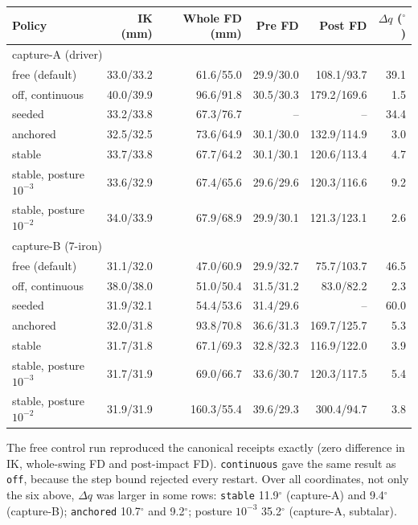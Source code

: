 \documentclass[11pt,a4paper]{article}
\begin{document}
\begin{center}
\small
\begin{tabular}{lrrrrr}
\hline
Policy & IK (mm) & Whole FD (mm) & Pre FD & Post FD & $\Delta q$ ($^\circ$) \\
\hline
\multicolumn{6}{l}{capture-A (driver)} \\
free (default) & 33.0/33.2 & 61.6/55.0 & 29.9/30.0 & 108.1/93.7 & 39.1 \\
off, continuous & 40.0/39.9 & 96.6/91.8 & 30.5/30.3 & 179.2/169.6 & 1.5 \\
seeded & 33.2/33.8 & 67.3/76.7 & -- & -- & 34.4 \\
anchored & 32.5/32.5 & 73.6/64.9 & 30.1/30.0 & 132.9/114.9 & 3.0 \\
stable & 33.7/33.8 & 67.7/64.2 & 30.1/30.1 & 120.6/113.4 & 4.7 \\
stable, posture $10^{-3}$ & 33.6/32.9 & 67.4/65.6 & 29.6/29.6 & 120.3/116.6 & 9.2 \\
stable, posture $10^{-2}$ & 34.0/33.9 & 67.9/68.9 & 29.9/30.1 & 121.3/123.1 & 2.6 \\
\multicolumn{6}{l}{capture-B (7-iron)} \\
free (default) & 31.1/32.0 & 47.0/60.9 & 29.9/32.7 & 75.7/103.7 & 46.5 \\
off, continuous & 38.0/38.0 & 51.0/50.4 & 31.5/31.2 & 83.0/82.2 & 2.3 \\
seeded & 31.9/32.1 & 54.4/53.6 & 31.4/29.6 & -- & 60.0 \\
anchored & 32.0/31.8 & 93.8/70.8 & 36.6/31.3 & 169.7/125.7 & 5.3 \\
stable & 31.7/31.8 & 67.1/69.3 & 32.8/32.3 & 116.9/122.0 & 3.9 \\
stable, posture $10^{-3}$ & 31.7/31.9 & 69.0/66.7 & 33.6/30.7 & 120.3/117.5 & 5.4 \\
stable, posture $10^{-2}$ & 31.9/31.9 & 160.3/55.4 & 39.6/29.3 & 300.4/94.7 & 3.8 \\
\hline
\end{tabular}
\end{center}

The free control run reproduced the canonical receipts exactly (zero
difference in IK, whole-swing FD and post-impact FD). \texttt{continuous} gave
the same result as \texttt{off}, because the step bound rejected every
restart. Over all coordinates, not only the six above, $\Delta q$ was larger
in some rows: \texttt{stable} 11.9$^\circ$ (capture-A) and 9.4$^\circ$
(capture-B); \texttt{anchored} 10.7$^\circ$ and 9.2$^\circ$; posture
$10^{-3}$ 35.2$^\circ$ (capture-A, subtalar).
\end{document}
